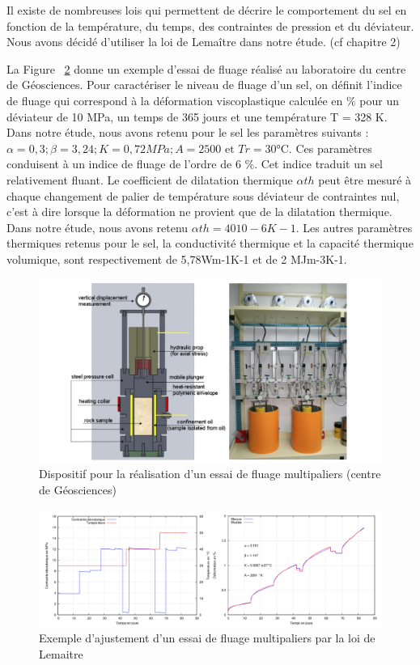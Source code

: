 \documentclass[11pt,french,a4paper]{article}
\begin{document}
Il existe de nombreuses lois qui permettent de décrire le comportement du sel en fonction de la température, du temps, des contraintes de pression et du déviateur. Nous avons décidé d’utiliser la loi de Lemaître dans notre étude. (cf chapitre 2) 

La Figure ~\ref{fig:d13} donne un exemple d'essai de fluage réalisé au laboratoire du centre de Géosciences.
Pour caractériser le niveau de fluage d'un sel, on définit l'indice de fluage qui correspond à la déformation viscoplastique calculée en \% pour un déviateur de 10 MPa, un temps de 365 jours et une température T = 328 K. 
Dans notre étude, nous avons retenu pour le sel les paramètres suivants : $\alpha=0,3 ; \beta=3,24 ; K = 0,72MPa ; A=2500 \textrm{ et } Tr=30 \textrm{°C}$. Ces paramètres conduisent à un indice de fluage de l'ordre de 6 \%. Cet indice traduit un sel relativement fluant.
Le coefficient de dilatation thermique $\alpha th$ peut être mesuré à chaque changement de palier de température sous déviateur de contraintes nul, c'est à dire lorsque la déformation ne provient que de la dilatation thermique. Dans notre étude, nous avons retenu $\alpha th = 40 10-6 K-1$. Les autres paramètres thermiques retenus pour le sel, la conductivité thermique et la capacité thermique volumique, sont respectivement de 5,78Wm-1K-1 et de 2 MJm-3K-1.

\begin{figure}[h]
\centering
\includegraphics[width=.8\linewidth]{image/annexe/annexe_D/D12.png}
\caption{Dispositif pour la réalisation d'un essai de fluage multipaliers (centre de Géosciences)}
\label{fig:d12}
\end{figure}
\FloatBarrier

\begin{figure}[h]
\centering
\includegraphics[width=.8\linewidth]{image/annexe/annexe_D/D13.png}
\caption{Exemple d'ajustement d'un essai de fluage multipaliers par la loi de Lemaitre}
\label{fig:d13}
\end{figure}
\FloatBarrier
\end{document}

